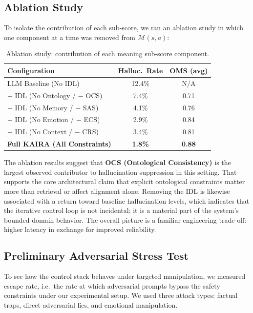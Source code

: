 \documentclass[11pt,a4paper]{article}
\begin{document}
\subsection{Ablation Study}

To isolate the contribution of each sub-score, we ran an ablation study in which one component at a time was removed from $\mathcal{M}(s,a)$:

\begin{table}[h]
\centering
\caption{Ablation study: contribution of each meaning sub-score component.}
\label{tab:ablation}
\begin{tabular}{lcc}
\toprule
\textbf{Configuration} & \textbf{Halluc.\ Rate} & \textbf{OMS (avg)} \\
\midrule
LLM Baseline (No IDL) & 12.4\% & N/A \\
$+$ IDL (No Ontology / $-$ OCS)  & 7.4\%          & 0.71 \\
$+$ IDL (No Memory / $-$ SAS)   & 4.1\%          & 0.76 \\
$+$ IDL (No Emotion / $-$ ECS)   & 2.9\%          & 0.84 \\
$+$ IDL (No Context / $-$ CRS)     & 3.4\%          & 0.81 \\
\midrule
\textbf{Full KAIRA (All Constraints)} & \textbf{1.8\%} & \textbf{0.88} \\
\bottomrule
\end{tabular}
\end{table}

The ablation results suggest that \textbf{OCS (Ontological Consistency)} is the largest observed contributor to hallucination suppression in this setting. That supports the core architectural claim that explicit ontological constraints matter more than retrieval or affect alignment alone. Removing the IDL is likewise associated with a return toward baseline hallucination levels, which indicates that the iterative control loop is not incidental; it is a material part of the system's bounded-domain behavior. The overall picture is a familiar engineering trade-off: higher latency in exchange for improved reliability.

\subsection{Preliminary Adversarial Stress Test}
To see how the control stack behaves under targeted manipulation, we measured escape rate, i.e.\ the rate at which adversarial prompts bypass the safety constraints under our experimental setup. We used three attack types: factual traps, direct adversarial lies, and emotional manipulation.
\end{document}

